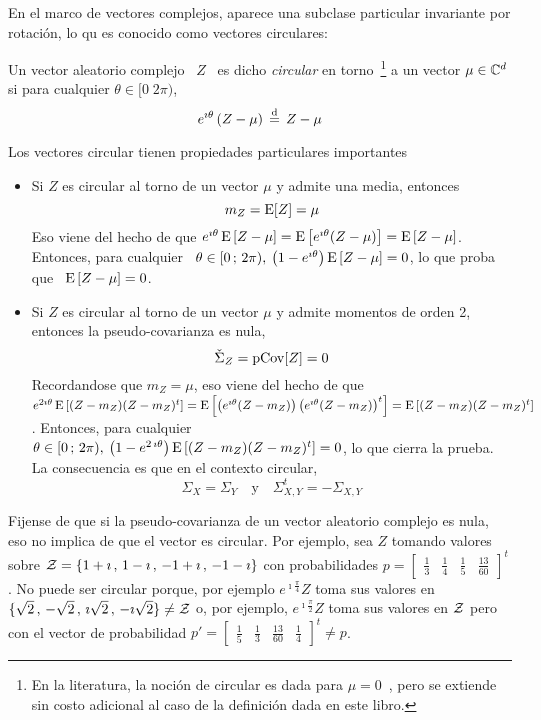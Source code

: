 En el  marco de vectores  complejos, aparece una subclase  particular invariante
por rotaci\'on, lo qu es conocido como vectores circulares:
%
\begin{definicion}\label{Def:MP:VectorAleatorioComplejoCircular}
%
  Un  vector   aleatorio  complejo   \  $Z$  \   es  dicho  {\em   circular}  en
  torno~\footnote{En la literatura, la noci\'on  de circular es dada para $\mu =
    0$~\cite[Def.~24.3.2]{Lap17}, pero  se extiende sin costo  adicional al caso
    de la  definici\'on dada en este libro.}   a un vector $\mu  \in \mathbb{C}^d$ si
  para cualquier $\theta \in [0 \; 2 \pi)$,
  \[
  e^{\imath \theta} \left( Z - \mu \right) \, \stackrel{\mathrm{d}}{=} \, Z - \mu
  \]
\end{definicion}

Los vectores circular tienen propiedades particulares importantes
%
\begin{itemize}
\item  Si $Z$  es circular  al torno  de  un vector  $\mu$ y  admite una  media,
  entonces
  \[
  m_Z = \operatorname{E}[Z] = \mu
  \]
  Eso viene  del hecho de  que $e^{\imath \theta}  \operatorname{E}\left[ Z - \mu  \right] =
  \operatorname{E}\left[  e^{\imath  \theta}  (Z  -  \mu)  \right]  =  \operatorname{E}\left[  Z  -  \mu
  \right]$. Entonces,  para cualquier \ $\theta \in  [0 \, ; \, 2 \pi),  \: \left(1 -
    e^{\imath \theta} \right) \operatorname{E}\left[ Z -  \mu \right] = 0$, lo que proba que
  \ $\operatorname{E}\left[ Z - \mu \right] = 0$.
%
\item Si $Z$ es circular al torno  de un vector $\mu$ y admite momentos de orden
  2, entonces la pseudo-covarianza es  nula,
  \[
  \check{\Sigma}_Z = \operatorname{pCov}[Z] = 0
  \]
  Recordandose que $m_Z = \mu$, eso  viene del hecho de que $e^{2 \imath \theta}
  \operatorname{E}\left[ (Z - m_Z) (Z - m_Z)^t \right] = \operatorname{E}\left[ \left( e^{\imath \theta}
      (Z - m_Z)  \right) \left( e^{\imath \theta} (Z -  m_Z) \right)^t \right] =
  \operatorname{E}\left[ (Z - m_Z) (Z - m_Z)^t \right]$.  Entonces, para cualquier \ $\theta
  \in [0 \, ; \, 2 \pi), \: \left(1  - e^{2 \, \imath \theta} \right) \operatorname{E}\left[ (Z -
    m_Z) (Z - m_Z)^t  \right] = 0$, lo que cierra la  prueba. La consecuencia es
  que en el contexto circular,
  \[
  \Sigma_X = \Sigma_Y \quad \mbox{y} \quad \Sigma_{X,Y}^t = - \Sigma_{X,Y}
  \]
\end{itemize}

Fijense de que si la pseudo-covarianza  de un vector aleatorio complejo es nula,
eso  no implica de  que el  vector es  circular.  Por  ejemplo, sea  $Z$ tomando
valores sobre  $\mathcal{Z} =  \{ 1+\imath \,  , \, 1-\imath  \, ,  \, -1+\imath \,  , \,
-1-\imath  \}$ con  probabilidades  $p  = \begin{bmatrix}  \frac13  & \frac14  &
  \frac15 &  \frac{13}{60} \end{bmatrix}^t$. No  puede ser circular  porque, por
ejemplo $e^{\imath  \frac{\pi}{4}} Z$  toma sus  valores en $\{  \sqrt2 \,  , \,
-\sqrt2 \, , \, \imath \sqrt2 \, ,  \, -\imath \sqrt2 \} \ne \mathcal{Z}$ o, por ejemplo,
$e^{\imath \frac{\pi}{2}}  Z$ toma  sus valores  en $\mathcal{Z}$ pero  con el  vector de
probabilidad  $p'  =  \begin{bmatrix}   \frac15  &  \frac13  &  \frac{13}{60}  &
  \frac14\end{bmatrix}^t \ne p$.

